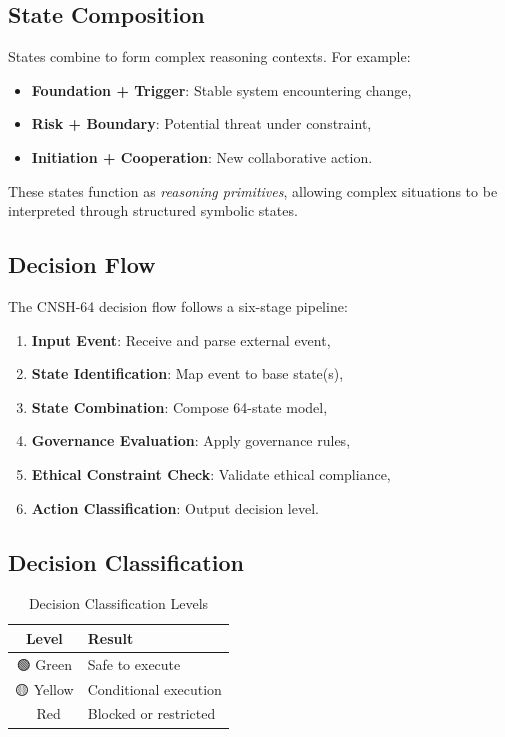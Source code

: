 \documentclass[conference]{IEEEtran}
\begin{document}
\subsection{State Composition}

States combine to form complex reasoning contexts.
For example:
\begin{itemize}[nosep]
  \item \textbf{Foundation + Trigger}: Stable system encountering change,
  \item \textbf{Risk + Boundary}: Potential threat under constraint,
  \item \textbf{Initiation + Cooperation}: New collaborative action.
\end{itemize}

These states function as \emph{reasoning primitives},
allowing complex situations to be interpreted through
structured symbolic states.

\subsection{Decision Flow}

The CNSH-64 decision flow follows a six-stage pipeline:

\begin{enumerate}[nosep]
  \item \textbf{Input Event}: Receive and parse external event,
  \item \textbf{State Identification}: Map event to base state(s),
  \item \textbf{State Combination}: Compose 64-state model,
  \item \textbf{Governance Evaluation}: Apply governance rules,
  \item \textbf{Ethical Constraint Check}: Validate ethical compliance,
  \item \textbf{Action Classification}: Output decision level.
\end{enumerate}

\subsection{Decision Classification}

\begin{table}[t]
\centering
\caption{Decision Classification Levels}
\label{tab:classification}
\renewcommand{\arraystretch}{1.2}
\begin{tabular}{cl}
\toprule
\textbf{Level} & \textbf{Result} \\
\midrule
\textcolor{cnsGreen}{🟢 Green} & Safe to execute \\
\textcolor{cnsGold}{🟡 Yellow} & Conditional execution \\
\textcolor{cnsRed}{🔴 Red} & Blocked or restricted \\
\bottomrule
\end{tabular}
\end{table}
\end{document}
